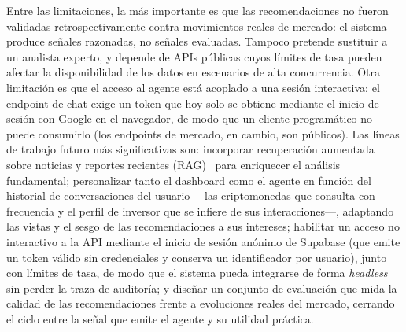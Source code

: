 \documentclass[runningheads]{llncs}
\begin{document}
Entre las limitaciones, la más importante es que las recomendaciones no fueron validadas
retrospectivamente contra movimientos reales de mercado: el sistema produce señales
razonadas, no señales evaluadas. Tampoco pretende sustituir a un analista experto, y depende
de APIs públicas cuyos límites de tasa pueden afectar la disponibilidad de los datos en
escenarios de alta concurrencia. Otra limitación es que el acceso al agente está acoplado a
una sesión interactiva: el endpoint de chat exige un token que hoy solo se obtiene mediante
el inicio de sesión con Google en el navegador, de modo que un cliente programático no puede
consumirlo (los endpoints de mercado, en cambio, son públicos). Las líneas de trabajo futuro
más significativas son: incorporar recuperación aumentada sobre noticias y reportes recientes
(RAG)~\cite{lewis2020rag} para enriquecer el análisis fundamental; personalizar tanto el
dashboard como el agente en función del historial de conversaciones del usuario —las
criptomonedas que consulta con frecuencia y el perfil de inversor que se infiere de sus
interacciones—, adaptando las vistas y el sesgo de las recomendaciones a sus intereses;
habilitar un acceso no interactivo a la API mediante el inicio de sesión anónimo de Supabase
(que emite un token válido sin credenciales y conserva un identificador por usuario), junto
con límites de tasa, de modo que el sistema pueda integrarse de forma \emph{headless} sin
perder la traza de auditoría; y diseñar un conjunto de evaluación que mida la calidad de las
recomendaciones frente a evoluciones reales del mercado, cerrando el ciclo entre la señal que
emite el agente y su utilidad práctica.



\end{document}
